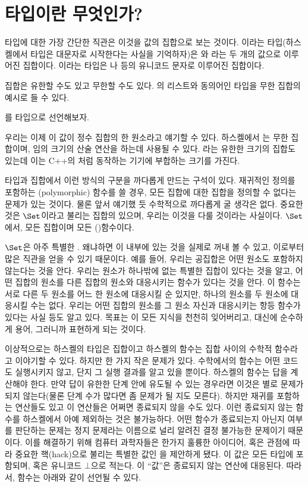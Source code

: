\section{타입이란 무엇인가?}

타입에 대한 가장 간단한 직관은 이것을 값의 집합으로 보는 것이다.
이라는 타입(하스켈에서 타입은 대문자로 시작한다는 사실을 기억하자)은 와 라는 두 개의 값으로 이루어진 집합이다.
이라는 타입은 나  등의 유니코드 문자로 이루어진 집합이다.

집합은 유한할 수도 있고 무한할 수도 있다. 의 리스트와 동의어인  타입을 무한 집합의 예시로 들 수 있다.

를  타입으로 선언해보자.

우리는 이제 이 값이 정수 집합의 한 원소라고 얘기할 수 있다.
하스켈에서 는 무한 집합이며, 임의 크기의 산술 연산을 하는데 사용될 수 있다. 라는 유한한 크기의 집합도 있는데 이는 C++의 처럼 동작하는 기기에 부합하는 크기를 가진다.

타입과 집합에서 이런 방식의 구분을 까다롭게 만드는 구석이 있다.
재귀적인 정의를 포함하는 \trPolymorphic(polymorphic) 함수를 쓸 경우, 모든 집합에 대한 집합을 정의할 수 없다는 문제가 있는 것이다.
물론 앞서 얘기했 듯 수학적으로 까다롭게 굴 생각은 없다. 중요한 것은 $\Set$이라고 불리는 집합의 \trCategory\가 있으며, 우리는 이것을 다룰 것이라는 사실이다.
$\Set$에서, 모든 \trObject\는 집합이며 모든 \trMorphism(\trArrow)\은 함수이다.

$\Set$은 아주 특별한 . 왜냐하면 이  \trObject 내부에 있는 것을 실제로 꺼내 볼 수 있고, 이로부터 많은 직관을 얻을 수 있기 때문이다.
예를 들어, 우리는 공집합은 어떤 원소도 포함하지 않는다는 것을 안다. 우리는 원소가 하나밖에 없는 특별한 집합이 있다는 것을 알고, 어떤 집합의 원소를 다른 집합의 원소와 대응시키는 함수가 있다는 것을 안다.
이 함수는 서로 다른 두 원소를 어느 한 원소에 대응시킬 순 있지만, 하나의 원소를 두 원소에 대응시킬 수는 없다.
우리는 어떤 집합의 원소를 그 원소 자신과 대응시키는 항등 함수가 있다는 사실 등도 알고 있다.
목표는 이 모든 지식을 천천히 잊어버리고, 대신에 순수하게  용어, 그러니까 \trObject\와 \trArrow\로 표현하게 되는 것이다.

이상적으로는 하스켈의 타입은 집합이고 하스켈의 함수는 집합 사이의 수학적 함수라고 이야기할 수 있다.
하지만 한 가지 작은 문제가 있다. 수학에서의 함수는 어떤 코드도 실행시키지 않고, 단지 그 실행 결과를 알고 있을 뿐이다.
하스켈의 함수는 답을 계산해야 한다. 만약 답이 유한한 단계 안에 유도될 수 있는 경우라면 이것은 별로 문제가 되지 않는다(물론 단계 수가 많다면 좀 문제가 될 지도 모른다).
하지만 재귀를 포함하는 연산들도 있고 이 연산들은 어쩌면 종료되지 않을 수도 있다. 이런 종료되지 않는 함수를 하스켈에서 아예 제외하는 것은 불가능하다.
어떤 함수가 종료되는지 아닌지 여부를 판단하는 문제는 정지 문제라는 이름으로 널리 알려진 결정 불가능한 문제이기 때문이다.
이를 해결하기 위해 컴퓨터 과학자들은 한가지 훌륭한 아이디어, 혹은 관점에 따라 중요한 핵(hack)으로 불리는 특별한 값인 \newterm{\trBottom}을 제안하게 됐다.
이 값은 모든 타입에 포함되며, \code{\_|\_} 혹은 유니코드 $\bot$으로 적는다. 이 ``값''은 종료되지 않는 연산에 대응된다. 따라서, 함수는 아래와 같이 선언될 수 있다.

